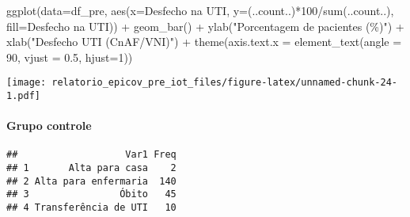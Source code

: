 \documentclass[
]{article}
\newenvironment{Shaded}{\begin{snugshade}}{\end{snugshade}}
\newcommand{\AttributeTok}[1]{\textcolor[rgb]{0.77,0.63,0.00}{#1}}
\newcommand{\DecValTok}[1]{\textcolor[rgb]{0.00,0.00,0.81}{#1}}
\newcommand{\FloatTok}[1]{\textcolor[rgb]{0.00,0.00,0.81}{#1}}
\newcommand{\FunctionTok}[1]{\textcolor[rgb]{0.00,0.00,0.00}{#1}}
\newcommand{\NormalTok}[1]{#1}
\newcommand{\SpecialCharTok}[1]{\textcolor[rgb]{0.00,0.00,0.00}{#1}}
\newcommand{\StringTok}[1]{\textcolor[rgb]{0.31,0.60,0.02}{#1}}
\begin{document}
\begin{Shaded}
\begin{Highlighting}[]
\FunctionTok{ggplot}\NormalTok{(}\AttributeTok{data=}\NormalTok{df\_pre, }\FunctionTok{aes}\NormalTok{(}\AttributeTok{x=}\StringTok{\textasciigrave{}}\AttributeTok{Desfecho na UTI}\StringTok{\textasciigrave{}}\NormalTok{, }\AttributeTok{y=}\NormalTok{(..count..)}\SpecialCharTok{*}\DecValTok{100}\SpecialCharTok{/}\FunctionTok{sum}\NormalTok{(..count..), }\AttributeTok{fill=}\StringTok{\textasciigrave{}}\AttributeTok{Desfecho na UTI}\StringTok{\textasciigrave{}}\NormalTok{)) }\SpecialCharTok{+}
  \FunctionTok{geom\_bar}\NormalTok{() }\SpecialCharTok{+}
  \FunctionTok{ylab}\NormalTok{(}\StringTok{"Porcentagem de pacientes (\%)"}\NormalTok{) }\SpecialCharTok{+}
  \FunctionTok{xlab}\NormalTok{(}\StringTok{"Desfecho UTI (CnAF/VNI)"}\NormalTok{) }\SpecialCharTok{+}
  \FunctionTok{theme}\NormalTok{(}\AttributeTok{axis.text.x =} \FunctionTok{element\_text}\NormalTok{(}\AttributeTok{angle =} \DecValTok{90}\NormalTok{, }\AttributeTok{vjust =} \FloatTok{0.5}\NormalTok{, }\AttributeTok{hjust=}\DecValTok{1}\NormalTok{))}
\end{Highlighting}
\end{Shaded}

\texttt{[image: relatorio\_epicov\_pre\_iot\_files/figure-latex/unnamed-chunk-24-1.pdf]}

\hypertarget{grupo-controle-5}{%
\paragraph{\texorpdfstring{\textbf{Grupo
controle}}{Grupo controle}}\label{grupo-controle-5}}

\begin{Shaded}
\end{Shaded}

\begin{verbatim}
##                   Var1 Freq
## 1       Alta para casa    2
## 2 Alta para enfermaria  140
## 3                Óbito   45
## 4 Transferência de UTI   10
\end{verbatim}

\begin{Shaded}
\end{Shaded}
\end{document}
